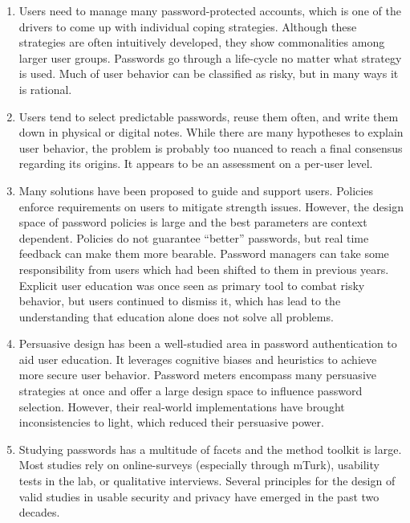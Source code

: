 \begin{enumerate}
	\item Users need to manage many password-protected accounts, which is one of the drivers to come up with individual coping strategies. Although these strategies are often intuitively developed, they show commonalities among larger user groups. Passwords go through a life-cycle no matter what strategy is used. Much of user behavior can be classified as risky, but in many ways it is rational.
	\item Users tend to select predictable passwords, reuse them often, and write them down in physical or digital notes. While there are many hypotheses to explain user behavior, the problem is probably too nuanced to reach a final consensus regarding its origins. It appears to be an assessment on a per-user level.
	\item Many solutions have been proposed to guide and support users. Policies enforce requirements on users to mitigate strength issues. However, the design space of password policies is large and the best parameters are context dependent. Policies do not guarantee ``better'' passwords, but real time feedback can make them more bearable. Password managers can take some responsibility from users which had been shifted to them in previous years. Explicit user education was once seen as primary tool to combat risky behavior, but users continued to dismiss it, which has lead to the understanding that education alone does not solve all problems.
	\item Persuasive design has been a well-studied area in password authentication to aid user education. It leverages cognitive biases and heuristics to achieve more secure user behavior. Password meters encompass many persuasive strategies at once and offer a large design space to influence password selection. However, their real-world implementations have brought inconsistencies to light, which reduced their persuasive power. 
	\item Studying passwords has a multitude of facets and the method toolkit is large. Most studies rely on online-surveys (especially through \gls{mTurk}), usability tests in the lab, or qualitative interviews. Several principles for the design of valid studies in usable security and privacy have emerged in the past two decades. 
\end{enumerate}

